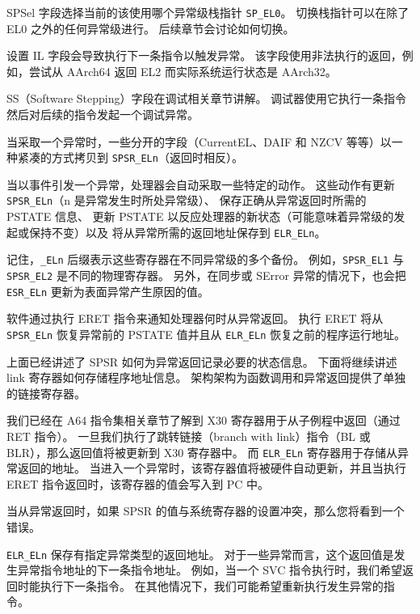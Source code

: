 SPSel 字段选择当前的该使用哪个异常级栈指针 \lstinline!SP_EL0!。
切换栈指针可以在除了 EL0 之外的任何异常级进行。
后续章节会讨论如何切换。

设置 IL 字段会导致执行下一条指令以触发异常。
该字段使用非法执行的返回，例如，尝试从 AArch64 返回 EL2 而实际系统运行状态是 AArch32。

SS（Software Stepping）字段在调试相关章节讲解。
调试器使用它执行一条指令然后对后续的指令发起一个调试异常。

当采取一个异常时，一些分开的字段（CurrentEL、DAIF 和 NZCV 等等）以一种紧凑的方式拷贝到 \lstinline!SPSR_ELn!（返回时相反）。

当以事件引发一个异常，处理器会自动采取一些特定的动作。
这些动作有更新 \lstinline!SPSR_ELn!（n 是异常发生时所处异常级）、
保存正确从异常返回时所需的 PSTATE 信息、
更新 PSTATE 以反应处理器的新状态（可能意味着异常级的发起或保持不变）以及
将从异常所需的返回地址保存到 \lstinline!ELR_ELn!。


记住，\lstinline!_ELn! 后缀表示这些寄存器在不同异常级的多个备份。
例如，\lstinline!SPSR_EL1! 与 \lstinline!SPSR_EL2! 是不同的物理寄存器。
另外，在同步或 SError 异常的情况下，也会把 \lstinline!ESR_ELn! 更新为表面异常产生原因的值。

软件通过执行 ERET 指令来通知处理器何时从异常返回。
执行 ERET 将从 \lstinline!SPSR_ELn! 恢复异常前的 PSTATE 值并且从 \lstinline!ELR_ELn! 恢复之前的程序运行地址。

上面已经讲述了 SPSR 如何为异常返回记录必要的状态信息。
下面将继续讲述 link 寄存器如何存储程序地址信息。
架构架构为函数调用和异常返回提供了单独的链接寄存器。

我们已经在 A64 指令集相关章节了解到 X30 寄存器用于从子例程中返回（通过 RET 指令）。
一旦我们执行了跳转链接（branch with link）指令（BL 或 BLR），那么返回值将被更新到 X30 寄存器中。
而 \lstinline!ELR_ELn! 寄存器用于存储从异常返回的地址。
当进入一个异常时，该寄存器值将被硬件自动更新，并且当执行 ERET 指令返回时，该寄存器的值会写入到 PC 中。

\begin{Tcbox}[title={Note}]
  当从异常返回时，如果 SPSR 的值与系统寄存器的设置冲突，那么您将看到一个错误。
\end{Tcbox}

\lstinline!ELR_ELn! 保存有指定异常类型的返回地址。
对于一些异常而言，这个返回值是发生异常指令地址的下一条指令地址。
例如，当一个 SVC 指令执行时，我们希望返回时能执行下一条指令。
在其他情况下，我们可能希望重新执行发生异常的指令。

